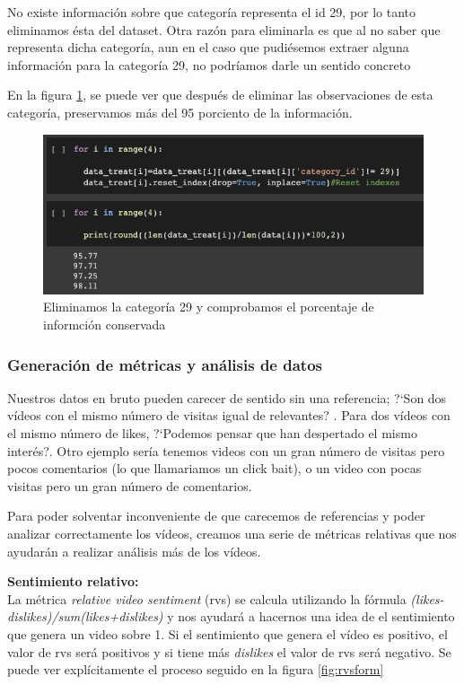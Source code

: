 \documentclass[a4paper,12pt]{article}
\begin{document}
No existe informaci\'on sobre que categor\'ia representa el id 29, por lo tanto eliminamos \'esta del dataset. Otra raz\'on para eliminarla es que al no saber que representa dicha categor\'ia, aun en el caso que pudi\'esemos extraer alguna informaci\'on para la categor\'ia 29, no podr\'iamos darle un sentido concreto

En la figura \ref{fig:cat29}, se puede ver que despu\'es de eliminar las observaciones de esta categor\'ia, preservamos m\'as del 95 porciento de la informaci\'on.

\begin{figure}[h!]
\centering
\includegraphics[width=13cm]{remove_category.png}
\caption{Eliminamos la categor\'ia 29 y comprobamos el porcentaje de informci\'on conservada}
\label{fig:cat29}
\end{figure}





\subsubsection[Metricas]{Generaci\'on de m\'etricas y an\'alisis de datos}

Nuestros datos en bruto pueden carecer de sentido sin una referencia; ?`Son dos v\'ideos con el mismo n\'umero de visitas igual de relevantes? . Para dos v\'ideos con el mismo n\'umero de likes, ?`Podemos pensar que han despertado el mismo inter\'es?. Otro ejemplo ser\'ia tenemos videos con un gran n\'umero de visitas pero pocos comentarios (lo que llamariamos un click bait), o un video con pocas visitas pero un gran n\'umero de comentarios.

Para poder solventar inconveniente de que carecemos de referencias y poder analizar correctamente los v\'ideos, creamos una serie de m\'etricas relativas que nos ayudar\'an a realizar an\'alisis m\'as  de los v\'ideos.

\textbf{Sentimiento relativo:} \\
La m\'etrica {\itshape relative video sentiment} (rvs) se calcula utilizando la f\'ormula {\itshape (likes-dislikes)/sum(likes+dislikes)} y nos ayudar\'a a hacernos una idea de el sentimiento que genera un video sobre 1. Si el sentimiento que genera el v\'ideo es positivo, el valor de rvs ser\'a positivos y si tiene m\'as {\itshape dislikes} el valor de rvs ser\'a negativo. Se puede ver expl\'icitamente el proceso seguido en la figura \ref{fig:rvsform}
\end{document}
